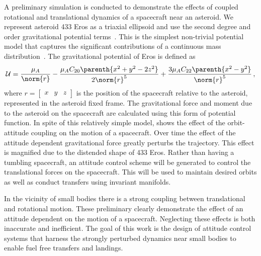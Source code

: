 \documentclass[11pt,draft]{article} %
\begin{document}
A preliminary simulation is conducted to demonstrate the effects of coupled rotational and translational dynamics of a spacecraft near an asteroid.
We represent asteroid 433 Eros as a triaxial ellipsoid and use the second degree and order gravitational potential terms~\cite{hu2008,scheeres2003}.
This is the simplest non-trivial potential model that captures the significant contributions of a continuous mass distribution~\cite{scheeres2012a}.
The gravitational potential of Eros is defined as
\begin{align*}
	\mathcal{U} = \frac{\mu_A}{\norm{r}}-\frac{\mu_A C_{20} \parenth{x^2 + y^2 - 2 z^2}}{2 \norm{r}^5} + \frac{3 \mu_A C_{22} \parenth{x^2 - y^2}}{\norm{r}^5}\, ,
\end{align*}
where \( r = \begin{bmatrix} x & y & z \end{bmatrix} \) is the position of the spacecraft relative to the asteroid, represented in the asteroid fixed frame.
The gravitational force and moment due to the asteroid on the spacecraft are calculated using this form of potential function.
In spite of this relatively simple model,  shows the effect of the orbit-attitude coupling on the motion of a spacecraft.
Over time the effect of the attitude dependent gravitational force greatly perturbs the trajectory.
This effect is magnified due to the distended shape of 433 Eros.
Rather than having a tumbling spacecraft, an attitude control scheme will be generated to control the translational forces on the spacecraft. 
This will be used to maintain desired orbits as well as conduct transfers using invariant manifolds.

In the vicinity of small bodies there is a strong coupling between translational and rotational motion.
These preliminary clearly demonstrate the effect of an attitude dependent on the motion of a spacecraft. 
Neglecting these effects is both inaccurate and inefficient. 
The goal of this work is the design of attitude control systems that harness the strongly perturbed dynamics near small bodies to enable fuel free transfers and landings.

%



\end{document}
